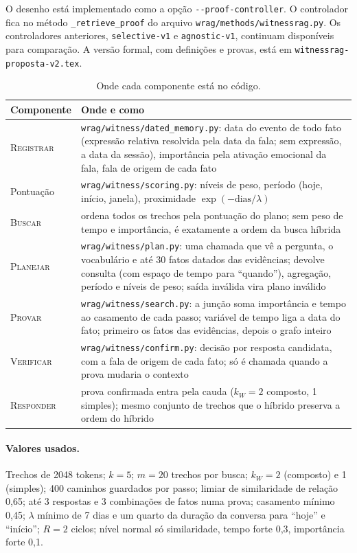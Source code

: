 \documentclass[11pt]{article}
\newcommand{\op}[1]{\textsc{#1}}
\begin{document}
{\sloppy O desenho está implementado como a opção \texttt{-{}-proof-controller}. O
controlador fica no método \texttt{\_retrieve\_proof} do arquivo
\texttt{wrag/\allowbreak methods/\allowbreak witnessrag.py}. Os
controladores anteriores, \texttt{selective-v1} e \texttt{agnostic-v1},
continuam disponíveis para comparação. A versão formal, com definições e
provas, está em \texttt{witnessrag-proposta-v2.tex}.\par}

\begin{table}[H]
\centering
\small
\begin{tabularx}{\textwidth}{@{}l Y@{}}
\toprule
Componente & Onde e como \\
\midrule
\op{Registrar} & \texttt{wrag/witness/dated\_memory.py}: data do evento de todo fato (expressão relativa resolvida pela data da fala; sem expressão, a data da sessão), importância pela ativação emocional da fala, fala de origem de cada fato \\
Pontuação & \texttt{wrag/witness/scoring.py}: níveis de peso, período (hoje, início, janela), proximidade $\exp(-\text{dias}/\lambda)$ \\
\op{Buscar} & ordena todos os trechos pela pontuação do plano; sem peso de tempo e importância, é exatamente a ordem da busca híbrida \\
\op{Planejar} & \texttt{wrag/witness/plan.py}: uma chamada que vê a pergunta, o vocabulário e até 30 fatos datados das evidências; devolve consulta (com espaço de tempo para ``quando''), agregação, período e níveis de peso; saída inválida vira plano inválido \\
\op{Provar} & \texttt{wrag/witness/search.py}: a junção soma importância e tempo ao casamento de cada passo; variável de tempo liga a data do fato; primeiro os fatos das evidências, depois o grafo inteiro \\
\op{Verificar} & \texttt{wrag/witness/confirm.py}: decisão por resposta candidata, com a fala de origem de cada fato; só é chamada quando a prova mudaria o contexto \\
\op{Responder} & prova confirmada entra pela cauda ($k_W=2$ composto, 1 simples); mesmo conjunto de trechos que o híbrido preserva a ordem do híbrido \\
\bottomrule
\end{tabularx}
\caption{Onde cada componente está no código.}
\label{tab:mapa}
\end{table}

\paragraph{Valores usados.} Trechos de 2048 tokens; $k=5$; $m=20$ trechos por
busca; $k_W=2$ (composto) e 1 (simples); 400 caminhos guardados por passo;
limiar de similaridade de relação 0,65; até 3 respostas e 3 combinações de
fatos numa prova; casamento mínimo 0,45; $\lambda$ mínimo de 7 dias e um
quarto da duração da conversa para ``hoje'' e ``início''; $R=2$ ciclos; nível
normal só similaridade, tempo forte 0,3, importância forte 0,1.



\end{document}
